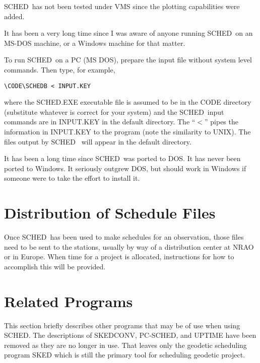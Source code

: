\documentclass{report}
\newcommand{\sched}{{\sc SCHED}}
\newcommand{\schedb}{{\sc SCHED~}}
\begin{document}
\schedb has not been tested under VMS since the plotting
capabilities were added.


It has been a very long time since I was aware of anyone running
\schedb on an MS-DOS machine, or a Windows machine for that matter.

To run \schedb on a PC (MS DOS), prepare the input file without
system level commands. Then type, for example,
\begin{verbatim}
\CODE\SCHEDB < INPUT.KEY
\end{verbatim}
where the SCHED.EXE executable file is assumed to be in the CODE
directory (substitute whatever is correct for your system) and the
\schedb input commands are in INPUT.KEY in the default
directory. The ``$<$'' pipes the information in INPUT.KEY to the
program (note the similarity to UNIX). The files output by \schedb
will appear in the default directory.

It has been a long time since \schedb was ported to DOS.  It has
never been ported to Windows.  It seriously outgrew DOS, but should
work in Windows if someone were to take the effort to install it.


\section{\label{SEC:DISFIL}Distribution of Schedule Files}

Once \schedb has been used to make schedules for an observation, those
files need to be sent to the stations, usually by way of a distribution
center at NRAO or in Europe.  When time for a project is allocated,
instructions for how to accomplish this will be provided.


\section{\label{SEC:RELATEDPROGRAMS}Related Programs}

This section briefly describes other programs that may be of use when
using \sched.  The descriptions of {\sc SKEDCONV}, {\sc PC-SCHED}, and
{\sc UPTIME} have been removed as they are no longer in use.  That leaves
only the geodetic scheduling program {\sc SKED} which is still the
primary tool for scheduling geodetic project.
\end{document}
